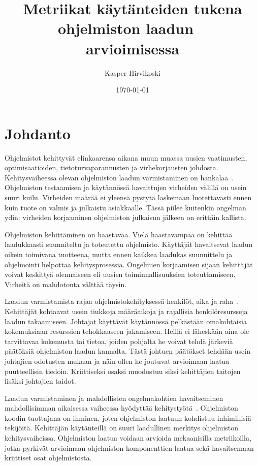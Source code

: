 \documentclass[finnish]{../tktltiki2}
\title{Metriikat käytänteiden tukena ohjelmiston laadun \ \\arvioimisessa}
\author{Kasper Hirvikoski}
\date{\today}
\theoremstyle{definition}
\theoremstyle{remark}
\begin{document}

\maketitle
\makeabstract

\tableofcontents
\newpage


\section{Johdanto}

Ohjelmistot kehittyvät elinkaarensa aikana muun muassa uusien vaatimusten, optimisaatioiden, tietoturvaparannusten ja 
virhekorjausten johdosta. Kehitysvaiheessa olevan ohjelmiston laadun varmistaminen on 
hankalaa~\cite{BBM96, NB05, NB07, ZN08, MNDT09}. Ohjelmiston testaamisen ja käytännössä havaittujen virheiden välillä on 
usein suuri kuilu. Virheiden määrää ei yleensä pystytä laskemaan luotettavasti ennen kuin tuote on valmis ja julkaistu 
asiakkaalle. Tässä piilee kuitenkin ongelman ydin: virheiden korjaaminen ohjelmiston julkaisun jälkeen on erittäin 
kallista.

    Ohjelmiston kehittäminen on haastavaa. Vielä haastavampaa on kehittää laadukkaasti suunniteltu ja toteutettu 
ohjelmisto. Käyttäjät havaitsevat laadun oikein toimivana tuotteena, mutta ennen kaikkea laadukas suunnittelu ja 
ohjelmointi helpottaa kehitysprosessia.  Ongelmien korjaamisen sijaan kehittäjät voivat keskittyä olennaiseen eli uusien 
toiminnallisuuksien toteuttamiseen. Virheitä on mahdotonta välttää täysin.

    Laadun varmistamista rajaa ohjelmistokehityksessä henkilöt, aika ja raha~\cite{BBM96, ZN08}. Kehittäjät kohtaavat 
usein tiukkoja määräaikoja ja rajallisia henkilöresursseja laadun takaamiseen. Johtajat käyttävät käytännössä pelkästään 
omakohtaisia kokemuksiaan resurssien tehokkaaseen jakamiseen. Heillä ei läheskään aina ole tarvittavaa kokemusta tai 
tietoa, joiden pohjalta he voivat tehdä järkeviä päätöksiä ohjelmiston laadun kannalta. Tästä johtuen päätökset tehdään 
usein johtajien odotusten mukaan ja näin ollen he joutuvat arvioimaan laatua puutteellisin tiedoin. Kriittiseksi osaksi 
muodostuu siksi kehittäjien taitojen lisäksi johtajien taidot.

    Laadun varmistaminen ja mahdollisten ongelmakohtien havaitseminen mahdollisimman aikaisessa vaiheessa hyödyttää 
kehitystyötä~\cite{BBM96, NB05}. Ohjelmiston koodin tuottajana on ihminen, joten ohjelmiston laatuun kohdistuu 
inhimillisiä tekijöitä. Kehittäjän käytänteillä on suuri laadullinen merkitys ohjelmiston kehitysvaiheissa. Ohjelmiston 
laatua voidaan arvioida mekaanisilla metriikoilla, jotka pyrkivät arvioimaan ohjelmiston komponenttien laatua sekä 
havaitsemaan kriittiset osat ohjelmistosta.
\end{document}
